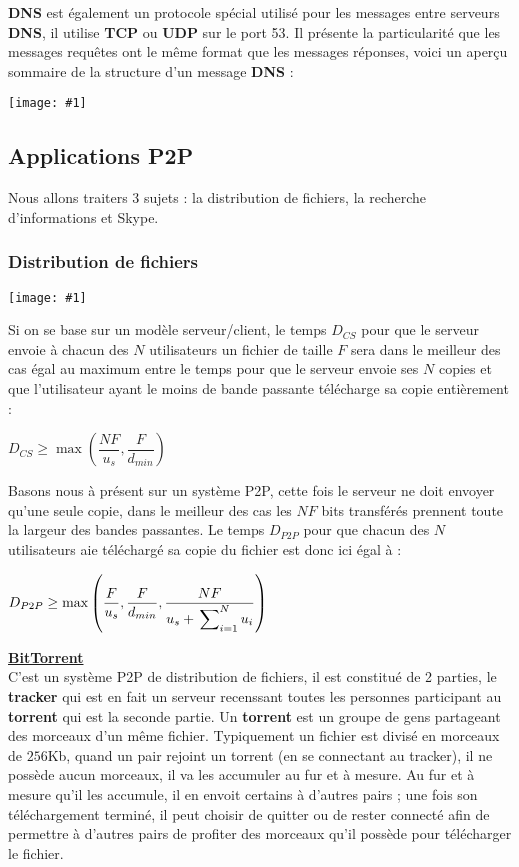\documentclass{article}
\newcommand{\imgR}[2]{\begin{center}\texttt{[image: \#1]}\end{center}}
\newcommand{\imgRT}[2]{\begin{center}\texttt{[image: \#1]}\end{center}}
\begin{document}
\textbf{DNS} est également un protocole spécial utilisé pour les messages entre serveurs \textbf{DNS}, il 
utilise \textbf{TCP} ou \textbf{UDP} sur le port 53. Il présente la particularité que les messages requêtes ont
le même format que les messages réponses, voici un aperçu sommaire de la structure d'un message \textbf{DNS} :

\imgRT{CN_021.png}{150}

\subsection{Applications P2P}

Nous allons traiters 3 sujets : la distribution de fichiers, la recherche d'informations et Skype.

\subsubsection{Distribution de fichiers}

\imgR{CN_022.png}{300}

Si on se base sur un modèle serveur/client, le temps $D_{CS}$ pour que le serveur envoie à chacun des $N$ 
utilisateurs un fichier de taille $F$ sera dans le meilleur des cas égal au maximum entre le temps pour que le 
serveur envoie ses $N$ copies et que l'utilisateur ayant le moins de bande passante télécharge sa copie
entièrement : 
\begin{center}
$D_{CS} \geq \max{\left(\dfrac{NF}{u_s},\dfrac{F}{d_{min}}\right)}$
\end{center}

Basons nous à présent sur un système P2P, cette fois le serveur ne doit envoyer qu'une seule copie, dans le 
meilleur des cas les $NF$ bits transférés prennent toute la largeur des bandes passantes. Le temps $D_{P2P}$ 
pour que chacun des $N$ utilisateurs aie téléchargé sa copie du fichier est donc ici égal à :
\begin{center}
$D_{P2P} \geq \max{\left(\dfrac{F}{u_s},\dfrac{F}{d_{min}},\dfrac{NF}{u_s+\sideset{}{_{i=1}^N}\sum{u_i}}\right)}$
\end{center}

\textbf{\underline{BitTorrent}} \\

C'est un système P2P de distribution de fichiers, il est constitué de 2 parties, le \textbf{tracker} qui est en 
fait un serveur recenssant toutes les personnes participant au \textbf{torrent} qui est la seconde partie. Un 
\textbf{torrent} est un groupe de gens partageant des morceaux d'un même fichier. Typiquement un fichier est
divisé en morceaux de $256$Kb, quand un pair rejoint un torrent (en se connectant au tracker), il ne possède 
aucun morceaux, il va les accumuler au fur et à mesure. Au fur et à mesure qu'il les accumule, il en envoit 
certains à d'autres pairs ; une fois son téléchargement terminé, il peut choisir de quitter ou de rester 
connecté afin de permettre à d'autres pairs de profiter des morceaux qu'il possède pour télécharger le fichier. 
\end{document}
